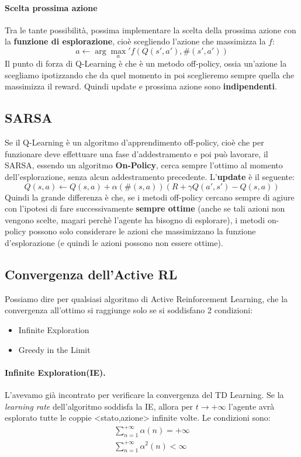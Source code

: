 \paragraph{Scelta prossima azione}
Tra le tante possibilità, possima implementare la scelta della prossima azione con la \textbf{funzione di esplorazione},
cioè scegliendo l'azione che massimizza la $f$:
\begin{equation}
    a \leftarrow \arg \max_a' f(Q(s',a'), \#(s',a'))
\end{equation}
Il punto di forza di Q-Learning è che è un metodo off-policy, ossia un'azione la scegliamo ipotizzando
che da quel momento in poi sceglieremo sempre quella che massimizza il reward. Quindi update
e prossima azione sono \textbf{indipendenti}.

\subsection{SARSA}
Se il Q-Learning è un algoritmo d'apprendimento off-policy, cioè che per funzionare deve effettuare
una fase d'addestramento e poi può lavorare, il SARSA, essendo un algoritmo \textbf{On-Policy}, cerca
sempre l'ottimo al momento dell'esplorazione, senza alcun addestramento precedente.
L'\textbf{update} è il seguente:
\begin{equation}
    Q(s,a) \leftarrow Q(s,a) + \alpha(\#(s,a))(R + \gamma Q(a',s') - Q(s,a))
\end{equation}
Quindi la grande differenza è che, se i metodi off-policy cercano sempre di agiure con l'ipotesi
di fare successivamente \textbf{sempre ottime} (anche se tali azioni non vengono scelte,
magari perchè l'agente ha bisogno di esplorare), i metodi on-policy possono solo considerare
le azioni che massimizzano la funzione d'esplorazione (e quindi le azioni possono non essere ottime).

\subsection{Convergenza dell'Active RL}
Possiamo dire per qualsiasi algoritmo di Active Reinforcement Learning, che la convergenza 
all'ottimo si raggiunge solo se si soddisfano 2 condizioni:
\begin{itemize}
    \item Infinite Exploration
    \item Greedy in the Limit
\end{itemize}

\paragraph{Infinite Exploration(IE).}L'avevamo già incontrato per verificare la convergenza del TD Learning.
Se la \textit{learning rate} dell'algoritmo soddisfa la IE, allora per $t\to +\infty$ l'agente avrà esplorato tutte le coppie <stato,azione> infinite volte.
Le condizioni sono:
\begin{gather*}
    \sum_{n = 1}^{+\infty} \alpha(n) = +\infty\\
    \sum_{n = 1}^{+\infty} \alpha^2(n) < \infty
\end{gather*}

